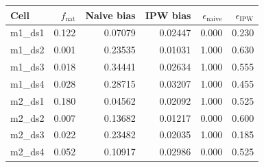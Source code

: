 \begingroup
\centering
\small
\begin{tabular}{lrrrrr}
\toprule
Cell & $f_{\text{nat}}$ & Naive bias & IPW bias & $\epsilon_{\text{naive}}$ & $\epsilon_{\text{IPW}}$ \\
\midrule
m1\_ds1 & 0.122 & 0.07079 & 0.02447 & 0.000 & 0.230 \\
m1\_ds2 & 0.001 & 0.23535 & 0.01031 & 1.000 & 0.630 \\
m1\_ds3 & 0.018 & 0.34441 & 0.02634 & 1.000 & 0.555 \\
m1\_ds4 & 0.028 & 0.28715 & 0.03207 & 1.000 & 0.455 \\
m2\_ds1 & 0.180 & 0.04562 & 0.02092 & 1.000 & 0.525 \\
m2\_ds2 & 0.007 & 0.13682 & 0.01217 & 0.000 & 0.600 \\
m2\_ds3 & 0.022 & 0.23482 & 0.02035 & 1.000 & 0.185 \\
m2\_ds4 & 0.052 & 0.10917 & 0.02986 & 0.000 & 0.525 \\
\bottomrule
\end{tabular}
\par\medskip
{}
\label{tab:a01_ipw_naive}
\par
\endgroup
\vspace{\baselineskip}
